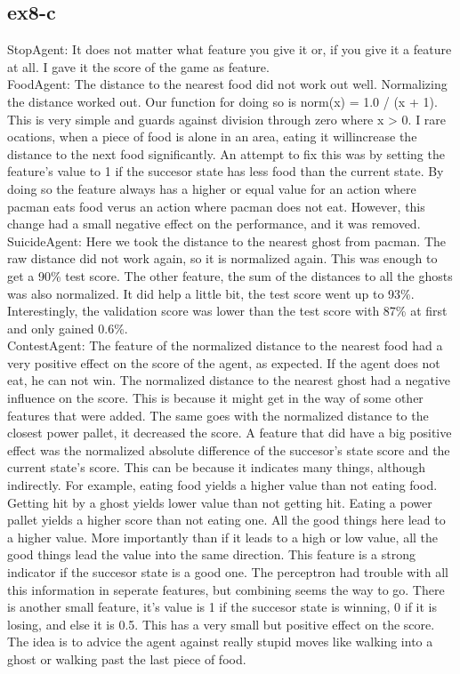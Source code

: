 \subsection{ex8-c}
StopAgent: It does not matter what feature you give it or, if you give it a feature at all. I gave it the score of the game as feature. \\
FoodAgent: The distance to the nearest food did not work out well. Normalizing the distance worked out. Our function for doing so is norm(x) = 1.0 / (x + 1). This is very simple and guards against division through zero where x > 0. I rare ocations, when a piece of food is alone in an area, eating it willincrease the distance to the next food significantly. An attempt to fix this was by setting the feature's value to 1 if the succesor state has less food than the current state. By doing so the feature always has a higher or equal value for an action where pacman eats food verus an action where pacman does not eat. However, this change had a small negative effect on the performance, and it was removed. \\
SuicideAgent: Here we took the distance to the nearest ghost from pacman. The raw distance did not work again, so it is normalized again. This was enough to get a 90\% test score. The other feature, the sum of the distances to all the ghosts was also normalized. It did help a little bit, the test score went up to 93\%. Interestingly, the validation score was lower than the test score with 87\% at first and only gained 0.6\%. \\
ContestAgent: The feature of the normalized distance to the nearest food had a very positive effect on the score of the agent, as expected. If the agent does not eat, he can not win. The normalized distance to the nearest ghost had a negative influence on the score. This is because it might get in the way of some other features that were added. The same goes with the normalized distance to the closest power pallet, it decreased the score. A feature that did have a big positive effect was the normalized absolute difference of the succesor's state score and the current state's score. This can be because it indicates many things, although indirectly. For example, eating food yields a higher value than not eating food. Getting hit by a ghost yields lower value than not getting hit. Eating a power pallet yields a higher score than not eating one. All the good things here lead to a higher value. More importantly than if it leads to a high or low value, all the good things lead the value into the same direction. This feature is a strong indicator if the succesor state is a good one. The perceptron had trouble with all this information in seperate features, but combining seems the way to go. There is another small feature, it's value is 1 if the succesor state is winning, 0 if it is losing, and else it is 0.5. This has a very small but positive effect on the score. The idea is to advice the agent against really stupid moves like walking into a ghost or walking past the last piece of food.
